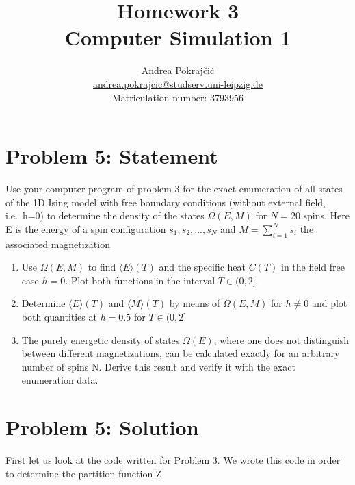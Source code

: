 \documentclass[11pt]{article}
\title{Homework 3\\[0.5ex]\large Computer Simulation 1}
\author{Andrea Pokraj\v{c}i\'{c}\\
    \normalsize\href{mailto:andrea.pokrajcic@studserv.uni-leipzig.de}{andrea.pokrajcic@studserv.uni-leipzig.de}\\
    \normalsize Matriculation number: 3793956}
\date{}
\begin{document}
    
    \maketitle
    
    

    
    \section*{Problem 5: Statement}\label{problem-5-statement}

Use your computer program of problem 3 for the exact enumeration of all
states of the 1D Ising model with free boundary conditions (without
external field, i.e.~h=0) to determine the density of the states
\(\Omega (E,M)\) for \(N=20\) spins. Here E is the energy of a spin
configuration \({s_1,s_2,...,s_N}\) and \(M = \sum_{i=1}^{N} s_i\) the
associated magnetization

\begin{enumerate}
\def\labelenumi{\alph{enumi})}
\item
  Use \(\Omega (E,M)\) to find \(\langle E \rangle(T)\) and the specific
  heat \(C(T)\) in the field free case \(h = 0\). Plot both functions in
  the interval \(T \in (0,2]\).
\item
  Determine \(\langle E \rangle (T)\) and \(\langle M \rangle(T)\) by
  means of \(\Omega (E,M)\) for \(h \neq 0\) and plot both quantities at
  \(h = 0.5\) for \(T \in (0,2]\)
\item
  The purely energetic density of states \(\Omega (E)\), where one does
  not distinguish between different magnetizations, can be calculated
  exactly for an arbitrary number of spins N. Derive this result and
  verify it with the exact enumeration data.
\end{enumerate}

    \section*{Problem 5: Solution}\label{problem-5-solution}

First let us look at the code written for Problem 3. We wrote this code
in order to determine the partition function Z.
\end{document}
